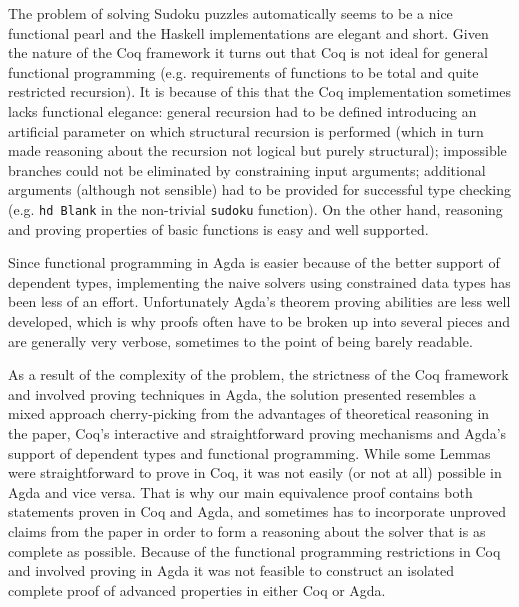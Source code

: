\documentclass[a4paper,11pt]{article}
\begin{document}
The problem of solving Sudoku puzzles automatically seems to be a nice functional pearl and the Haskell implementations are elegant and short. Given the nature of the Coq framework it turns out that Coq is not ideal for general functional programming (e.g. requirements of functions to be total and quite restricted recursion). It is because of this that the Coq implementation sometimes lacks functional elegance: general recursion had to be defined introducing an artificial parameter on which structural recursion is performed (which in turn made reasoning about the recursion not logical but purely structural); impossible branches could not be eliminated by constraining input arguments; additional arguments (although not sensible) had to be provided for successful type checking (e.g. \texttt{hd Blank} in the non-trivial \texttt{sudoku} function). On the other hand, reasoning and proving properties of basic functions is easy and well supported.

Since functional programming in Agda is easier because of the better support of dependent types, implementing the naive solvers using constrained data types has been less of an effort. Unfortunately Agda's theorem proving abilities are less well developed, which is why proofs often have to be broken up into several pieces and are generally very verbose, sometimes to the point of being barely readable. 

As a result of the complexity of the problem, the strictness of the Coq framework and involved proving techniques in Agda, the solution presented resembles a mixed approach cherry-picking from the advantages of theoretical reasoning in the paper, Coq's interactive and straightforward proving mechanisms and Agda's support of dependent types and functional programming. While some Lemmas were straightforward to prove in Coq, it was not easily (or not at all) possible in Agda and vice versa. That is why our main equivalence proof contains both statements proven in Coq and Agda, and sometimes has to incorporate unproved claims from the paper in order to form a reasoning about the solver that is as complete as possible. Because of the functional programming restrictions in Coq and involved proving in Agda it was not feasible to construct an isolated complete proof of advanced properties in either Coq or Agda.
\end{document}
